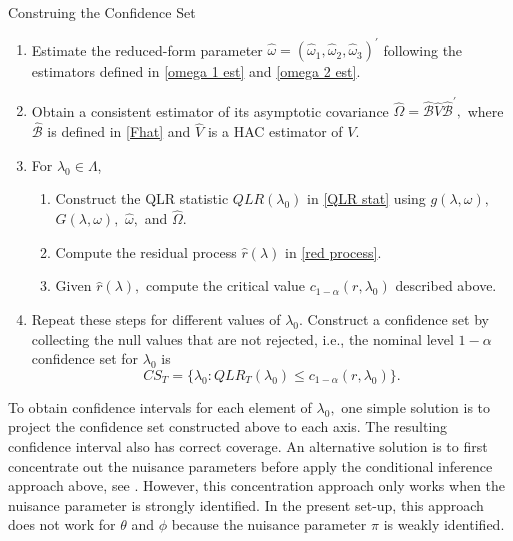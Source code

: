 \documentclass[11pt, letterpaper, twoside]{article}
\begin{document}
\begin{algorithm}
    \caption{Construing the Confidence Set}
    \label{alg:constructing_the_cs}
    
    \begin{enumerate}
        \item Estimate the reduced-form parameter $\widehat{\omega }=( \widehat{\omega }_{1},\widehat{\omega }_{2},\widehat{\omega }_{3})^{\prime }$ following the estimators defined in \cref{omega 1 est} and \cref{omega 2 est}.
%
        \item Obtain a consistent estimator of its asymptotic covariance $\widehat{ \Omega }=\widehat{\mathcal{B}}\widehat{V}\widehat{\mathcal{B}}^{\prime },$ where $\widehat{\mathcal{B}}$ is defined in \cref{Fhat} and $\widehat{V}$ is 
a HAC estimator of $V.$

        \item For $\lambda _{0}\in \Lambda$,
%
        \begin{enumerate}
            \item Construct the QLR statistic $QLR(\lambda _{0})$ in \cref{QLR stat} using $g(\lambda ,\omega ),$ $G(\lambda ,\omega ),$ $\widehat{\omega },$ and $\widehat{\Omega }.$
%
            \item Compute the residual process $\widehat{r}(\lambda )$ in \cref{red process}.

            \item Given $\widehat{r}(\lambda ),$ compute the critical value $c_{1-\alpha }(r,\lambda _{0})$ described above.
%
        \end{enumerate}
%
        \item Repeat these steps for different values of $\lambda _{0}$.  Construct a confidence set by collecting the null values that are not rejected, i.e., the nominal level $1-\alpha $ confidence set for $\lambda _{0}$ is
%
            \begin{equation}
                CS_{T}=\{ \lambda _{0}:QLR_{T}(\lambda _{0})\leq c_{1-\alpha }(r,\lambda_{0})\}.
            \end{equation}
    \end{enumerate}
\end{algorithm}

To obtain confidence intervals for each element of $\lambda _{0},$ one simple solution is to project the confidence set constructed above to each axis. The resulting confidence interval also has correct coverage. An alternative solution is to first concentrate out the nuisance parameters before apply the conditional inference approach above, see \textcite[Section 5]{andrews2016conditional}.  However, this concentration approach only works when the nuisance parameter is strongly identified. In the present set-up, this approach does not work for $\theta $ and $\phi $ because the nuisance parameter $\pi $ is weakly identified.  
\end{document}
